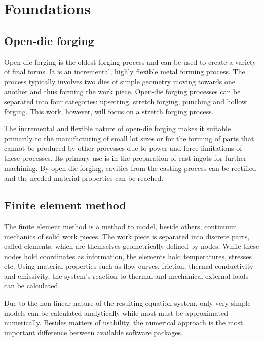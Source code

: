 \section{Foundations}

\subsection{Open-die forging}
Open-die forging is the oldest forging process and can be used to create a variety of final forms. It is an incremental, highly flexible metal forming process. The process typically involves two dies of simple geometry moving towards one another and thus forming the work piece. Open-die forging processes can be separated into four categories: upsetting, stretch forging, punching and hollow forging. This work, however, will focus on a stretch forging process.\cite{hbut}

The incremental and flexible nature of open-die forging makes it suitable primarily to the manufacturing of small lot sizes or for the forming of parts that cannot be produced by other processes due to power and force limitations of these processes. Its primary use is in the preparation of cast ingots for further machining. By open-die forging, cavities from the casting process can be rectified and the needed material properties can be reached.\cite{forgcomp}

\subsection{Finite element method}
The finite element method is a method to model, beside others, continuum mechanics of solid work pieces. The work piece is separated into discrete parts, called elements, which are themselves geometrically defined by nodes. While these nodes hold coordinates as information, the elements hold temperatures, stresses etc. Using material properties such as flow curves, friction, thermal conductivity and emissivity, the system's reaction to thermal and mechanical external loads can be calculated.

Due to the non-linear nature of the resulting equation system, only very simple models can be calculated analytically while most must be approximated numerically. Besides matters of usability, the numerical approach is the most important difference between available software packages.
